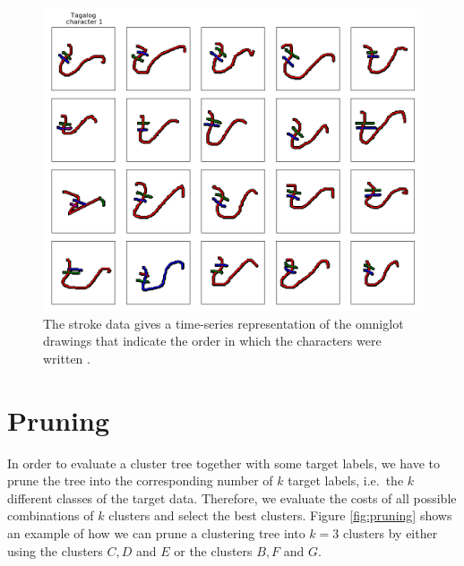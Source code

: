 \begin{figure}[h]
  \centering
  \includegraphics[width=.7\textwidth]{plots/demo_strokes}
  \caption{The stroke data gives a time-series representation of the omniglot drawings that indicate the order in which the characters were written \cite{Lake1332}.}
  \label{fig:omniglotstroke}
\end{figure}

\section{Pruning}

In order to evaluate a cluster tree together with some target labels, we have to prune the tree into the corresponding number of $k$ target labels, i.e.\ the $k$ different classes of the target data. Therefore, we evaluate the costs of all possible combinations of $k$ clusters and select the best clusters. Figure \ref{fig:pruning} shows an example of how we can prune a clustering tree into $k = 3$ clusters by either using the clusters $C, D$ and $E$ or the clusters $B, F$ and $G$.

